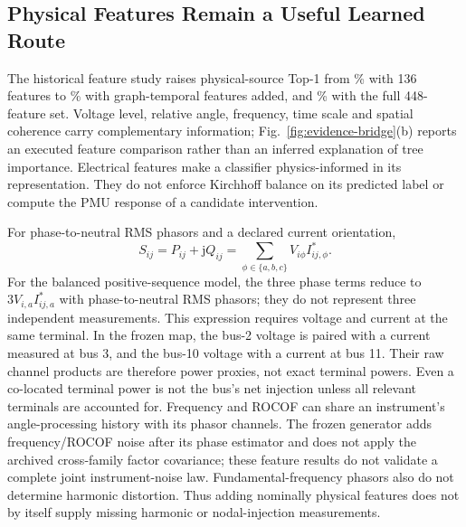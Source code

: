 \subsection{Physical Features Remain a Useful Learned Route}
The historical feature study raises physical-source Top-1 from
\BridgeBaseTop\% with 136 features to \BridgeGraphTop\% with graph-temporal
features added, and \BridgeFullTop\% with the full 448-feature set.
Voltage level, relative angle, frequency, time scale and spatial coherence
carry complementary information; Fig.~\ref{fig:evidence-bridge}(b) reports
an executed feature comparison rather than an inferred explanation of
tree importance. Electrical features make a classifier physics-informed
in its representation. They do not enforce Kirchhoff balance on its
predicted label or compute the PMU response of a candidate intervention.

For phase-to-neutral RMS phasors and a declared current orientation,
\begin{equation}
 S_{ij}=P_{ij}+\mathrm jQ_{ij}
       =\sum_{\phi\in\{a,b,c\}}V_{i\phi}I_{ij,\phi}^{*}.
 \label{eq:bridge-terminal-power}
\end{equation}
For the balanced positive-sequence model, the three phase terms reduce
to $3V_{i,a}I_{ij,a}^{*}$ with phase-to-neutral RMS phasors; they do not
represent three independent measurements. This expression requires
voltage and current at the same terminal.
In the frozen map, the bus-2 voltage is paired with a current measured at
bus 3, and the bus-10 voltage with a current at bus 11. Their raw channel
products are therefore power proxies, not exact terminal powers. Even a
co-located terminal power is not the bus's net injection unless all
relevant terminals are accounted for. Frequency and ROCOF can share an
instrument's angle-processing history with its phasor channels. The frozen
generator adds frequency/ROCOF noise after its phase estimator and does
not apply the archived cross-family factor covariance; these feature
results do not validate a complete joint instrument-noise law. Fundamental-frequency phasors also do not determine
harmonic distortion. Thus adding nominally physical features does not
by itself supply missing harmonic or nodal-injection measurements.

